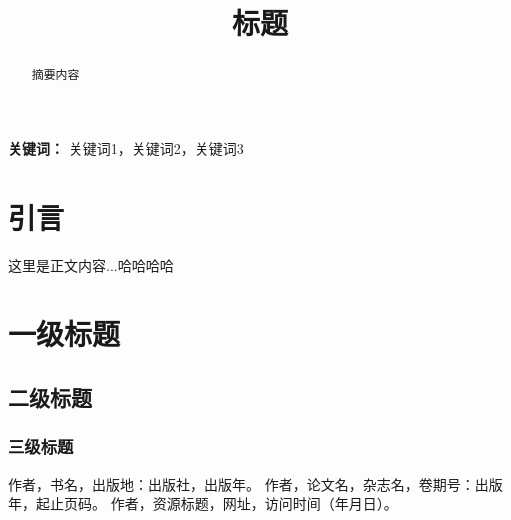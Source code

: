 \documentclass[12pt,a4paper]{article}
\title{\zihao{3}\heiti 标题}
\author{}
\date{}
\begin{document}
\maketitle
\vspace{-2.5cm}
\begin{abstract}
\vspace{-0.5cm}
\songti
摘要内容
\end{abstract}

\vspace{0cm}
\noindent%
\textbf{关键词：} 关键词1，关键词2，关键词3

\newpage

\section{引言}

这里是正文内容...哈哈哈哈

\section{一级标题}
\subsection{二级标题}
\subsubsection{三级标题}

\newpage
\begin{thebibliography}{99}
\songti
{} 作者，书名，出版地：出版社，出版年。
 作者，论文名，杂志名，卷期号：出版年，起止页码。
 作者，资源标题，网址，访问时间（年月日）。
\end{thebibliography}
\end{document}
